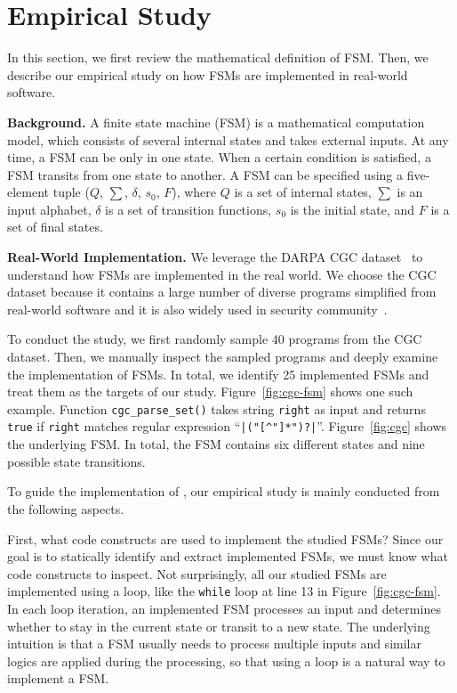 \section{Empirical Study}
\label{sec:study}
In this section, we first review the mathematical definition of FSM. Then,
we describe our empirical study on how FSMs are implemented 
in real-world software. 

\noindent\textbf{Background.}
A finite state machine (FSM) is a mathematical computation model, 
which consists of several internal states and takes external inputs.
At any time, a FSM can be only in one state. 
When a certain condition is satisfied, 
a FSM transits from one state to another. 
A FSM can be specified using a five-element tuple ($Q$, $\sum$, $\delta$, $s_0$, $F$),
where $Q$ is a set of internal states, $\sum$ is an input alphabet, 
$\delta$ is a set of transition functions,
$s_0$ is the initial state, and $F$ is a set of final states. 

\noindent\textbf{Real-World Implementation.}
We leverage the DARPA CGC dataset~\cite{CGC} to 
understand how FSMs are implemented in the real world. 
We choose the CGC dataset because it 
contains a large number of diverse programs simplified 
from real-world software and it 
is also widely used in security 
community~\cite{QSYM, Driller, VUzzer}. 


To conduct the study, we first randomly sample 
40 programs from the CGC dataset. Then, 
we manually inspect the sampled programs and deeply examine the implementation of FSMs.
In total, we identify 25 implemented FSMs
and treat them as the targets of our study.
Figure~\ref{fig:cgc-fsm} shows one such example.
Function \texttt{cgc\_parse\_set()} takes string \texttt{right} 
as input and returns \texttt{true} if \texttt{right} matches 
regular expression ``\verb/|("[^"]*")?|/''. 
Figure~\ref{fig:cgc} shows the underlying FSM. 
In total, the FSM contains six different states 
and nine possible state transitions. 





To guide the implementation of \Tool{}, our empirical study 
is mainly conducted from the following aspects.

First, what code constructs are used to implement the studied FSMs?
Since our goal is to statically identify and extract implemented FSMs, 
we must know what code constructs to inspect. 
Not surprisingly, all our studied FSMs are implemented using a loop, 
like the \texttt{while} loop at line 13 in Figure~\ref{fig:cgc-fsm}.  
In each loop iteration, an implemented FSM processes an input and 
determines whether to stay in the current state or transit to a new state. 
The underlying intuition is that a FSM usually needs to process 
multiple inputs and similar logics are applied during the processing, 
so that using a loop is a natural way to implement a FSM. 

